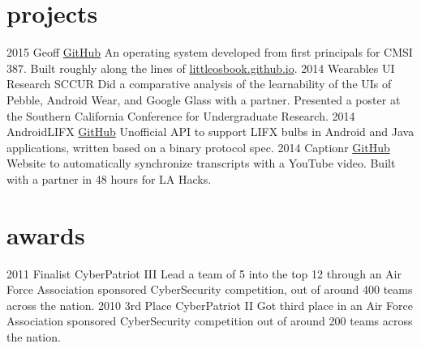 \documentclass[]{akers-cv}
\begin{document}
\section{projects}

\begin{entrylist}
  \entry
    {2015}
    {Geoff}
    {\href{https://github.com/akrs/cmsi387}{GitHub}}
    {An operating system developed from first principals for CMSI 387. Built roughly along the lines of \href{http://littleosbook.github.io}{littleosbook.github.io}.}
  \entry
    {2014}
    {Wearables UI Research}
    {SCCUR}
    {Did a comparative analysis of the learnability of the UIs of Pebble, Android Wear, and Google Glass with a partner. Presented a poster at the Southern California Conference for Undergraduate Research.}
  \entry
    {2014}
    {AndroidLIFX}
    {\href{https://github.com/akrs/AndroidLIFX}{GitHub}}
    {Unofficial API to support LIFX bulbs in Android and Java applications, written based on a binary protocol spec.}
  \entry
    {2014}
    {Captionr}
    {\href{http://https://github.com/alexschneider/Captionr}{GitHub}}
    {Website to automatically synchronize transcripts with a YouTube video. Built with a partner in 48 hours for LA Hacks.}
\end{entrylist}

\section{awards}
\begin{entrylist}
  \entry
    {2011}
    {Finalist}
    {CyberPatriot III}
    {Lead a team of 5 into the top 12 through an Air Force Association sponsored CyberSecurity competition, out of around 400 teams across the nation.}
  \entry
    {2010}
    {3rd Place}
    {CyberPatriot II}
    {Got third place in an Air Force Association sponsored CyberSecurity competition out of around 200 teams across the nation.}
 \end{entrylist}
\end{document}
